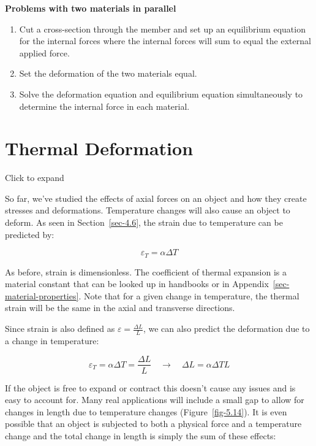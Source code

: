 \documentclass[
  letterpaper,
  DIV=11,
  numbers=noendperiod]{scrreprt}
\providecommand{\tightlist}{%
  \setlength{\itemsep}{0pt}\setlength{\parskip}{0pt}}\usepackage{longtable,booktabs,array}
\theoremstyle{definition}
\theoremstyle{remark}
\begin{document}
\begin{tcolorbox}
\textbf{Problems with two materials in parallel}

\begin{enumerate}
\def\labelenumi{\arabic{enumi}.}
\tightlist
\item
  Cut a cross-section through the member and set up an equilibrium
  equation for the internal forces where the internal forces will sum to
  equal the external applied force.
\item
  Set the deformation of the two materials equal.
\item
  Solve the deformation equation and equilibrium equation simultaneously
  to determine the internal force in each material.
\end{enumerate}

\end{tcolorbox}

\section{Thermal Deformation}\label{sec-5.6}

Click to expand

So far, we've studied the effects of axial forces on an object and how
they create stresses and deformations. Temperature changes will also
cause an object to deform. As seen in Section~\ref{sec-4.6}, the strain
due to temperature can be predicted by:

\[
\varepsilon_T=\alpha \Delta T
\]

As before, strain is dimensionless. The coefficient of thermal expansion
is a material constant that can be looked up in handbooks or in
Appendix~\ref{sec-material-properties}. Note that for a given change in
temperature, the thermal strain will be the same in the axial and
transverse directions.

Since strain is also defined as \(\varepsilon=\frac{\Delta L}{L}\), we
can also predict the deformation due to a change in temperature:

\[
\varepsilon_T=\alpha \Delta T=\frac{\Delta L}{L} \quad\rightarrow\quad \Delta L=\alpha \Delta T L
\]

If the object is free to expand or contract this doesn't cause any
issues and is easy to account for. Many real applications will include a
small gap to allow for changes in length due to temperature changes
(Figure~\ref{fig-5.14}). It is even possible that an object is subjected
to both a physical force and a temperature change and the total change
in length is simply the sum of these effects:
\end{document}
